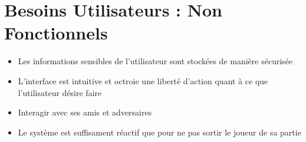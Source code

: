 \section{Besoins Utilisateurs : Non Fonctionnels}
\begin{itemize}
	\item Les informations sensibles de l'utilisateur sont stockées de manière sécurisée
	\item L'interface est intuitive et octroie une liberté d'action quant à ce que l'utilisateur désire faire
	\item Interagir avec ses amis et adversaires
	\item Le système est suffisament réactif que pour ne pas sortir le joueur de sa partie
\end{itemize}